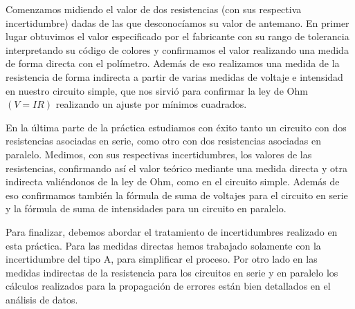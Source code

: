 \documentclass[a4paper,12pt,titlepage]{article}
\begin{document}
\par Comenzamos midiendo el valor de dos resistencias (con sus respectiva incertidumbre) dadas de las que desconocíamos su valor de antemano. En primer lugar obtuvimos el valor especificado por el fabricante con su rango de tolerancia interpretando su código de colores y confirmamos el valor realizando una medida de forma directa con el polímetro. Además de eso realizamos una medida de la resistencia de forma indirecta a partir de varias medidas de voltaje e intensidad en nuestro circuito simple, que nos sirvió para confirmar la ley de Ohm $(V=IR)$ realizando un ajuste por mínimos cuadrados.

\par En la última parte de la práctica estudiamos con éxito tanto un circuito con dos resistencias asociadas en serie, como otro con dos resistencias asociadas en paralelo. Medimos, con sus respectivas incertidumbres, los valores de las resistencias, confirmando así el valor teórico mediante una medida directa y otra indirecta valiéndonos de la ley de Ohm, como en el circuito simple. Además de eso confirmamos también la fórmula de suma de voltajes para el circuito en serie y la fórmula de suma de intensidades para un circuito en paralelo. 

\par Para finalizar, debemos abordar el tratamiento de incertidumbres realizado en esta práctica. Para las medidas directas hemos trabajado solamente con la incertidumbre del tipo A, para simplificar el proceso. Por otro lado en las medidas indirectas de la resistencia para los circuitos en serie y en paralelo los cálculos realizados para la propagación de errores están bien detallados en el análisis de datos.

\newpage
\end{document}
